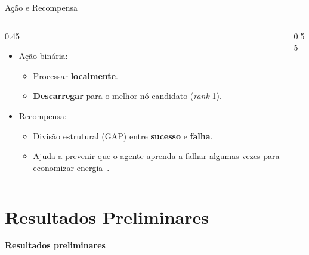 \documentclass[aspectratio=169]{beamer}
\begin{document}
\begin{frame}{Ação e Recompensa}
    \begin{columns}[T]
        \begin{column}{0.45\textwidth}
            \vspace{0.2cm}
            \begin{itemize}
                \item Ação binária:
                \begin{itemize}
                    \item Processar \textbf{localmente}.
                    \item \textbf{Descarregar} para o melhor nó candidato (\textit{rank} 1).
                \end{itemize}
                \item Recompensa:
                \begin{itemize}
                    \item Divisão estrutural (GAP) entre \textbf{sucesso} e \textbf{falha}.
                    \item Ajuda a prevenir que o agente aprenda a falhar algumas vezes para economizar energia~\cite{ng1999policy}.
                \end{itemize}
            \end{itemize}
        \end{column}
        \begin{column}{0.55\textwidth}
            \centering
            \vspace{1cm}
        \end{column}
    \end{columns}
\end{frame}

\section{Resultados Preliminares}
\begin{frame}
    \centering
    \Huge \textbf{Resultados preliminares}
\end{frame}
\end{document}
